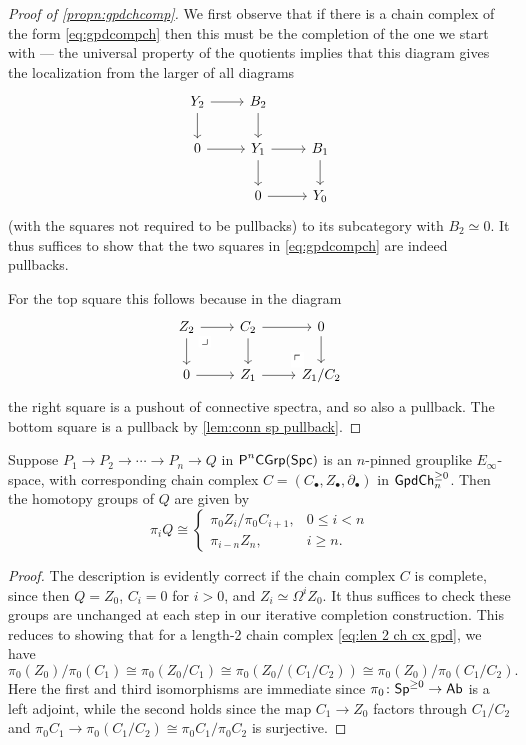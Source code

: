 \documentclass[a4paper,11pt]{article}
\begin{document}
\begin{proof}[Proof of \cref{propn:gpdchcomp}]
  We first observe that if there is a chain complex of the form
  \cref{eq:gpdcompch} then this must be the completion of the one we
  start with --- the universal property of the quotients implies that
  this diagram gives the localization from the larger \icat{} of
  all diagrams
  \[
    \begin{tikzcd}
      Y_{2} \ar[r] \ar[d] & B_{2} \ar[d] \\
      0 \ar[r] & Y_{1} \ar[d] \ar[r]  & B_{1} \ar[d] \\
      &  0 \ar[r] & Y_{0}
    \end{tikzcd}
  \]
  (with the squares not required to be pullbacks) to its subcategory
  with $B_{2} \simeq 0$. It thus suffices to show that the two squares
  in \cref{eq:gpdcompch} are indeed pullbacks.

  For the top square this follows because in the diagram
  \[
    \begin{tikzcd}
      Z_{2} \ar[r] \ar[d] \drpullback & C_{2} \ar[d] \ar[r] \arrow[phantom]{dr}[very near end,description]{\ulcorner} & 0 \ar[d]
      \\
      0 \ar[r]  & Z_{1} \ar[r] & Z_{1}/C_{2}
    \end{tikzcd}
  \]
  the right square is a pushout of connective spectra, and so also a
  pullback. The bottom square is a pullback by \cref{lem:conn sp
    pullback}.
\end{proof}

\begin{cor}\label{cor:complete htpy finite}
  Suppose $P_{1} \to P_{2} \to \cdots \to P_{n} \to Q$ in $\PCGrp[n]$ is an
  $n$-pinned grouplike $E_{\infty}$-space, with corresponding chain complex
  $C=(C_{\bullet}, Z_{\bullet}, \partial_{\bullet})$ in
  $\GpdChp_{n}$. Then the
  homotopy groups of $Q$ are given by
  \[ \pi_{i}Q \cong
    \begin{cases}
      \pi_{0}Z_{i}/\pi_{0}C_{i+1}, & 0 \leq i < n \\
      \pi_{i-n} Z_{n}, & i \geq n.
    \end{cases}
  \]
\end{cor}
\begin{proof}
  The description is evidently correct if the chain complex $C$ is
  complete, since then $Q = Z_{0}$, $C_{i} = 0$ for $i > 0$, and
  $Z_{i} \simeq \Omega^{i}Z_{0}$. It thus suffices to check these
  groups are unchanged at each step in our iterative completion
  construction. This reduces to showing that for a length-2 chain
  complex \cref{eq:len 2 ch cx gpd}, we have
  \[ \pi_{0}(Z_{0})/\pi_{0}(C_{1}) \cong \pi_{0}(Z_{0}/C_{1}) \cong
    \pi_{0}(Z_{0}/(C_{1}/C_{2})) \cong
    \pi_{0}(Z_{0})/\pi_{0}(C_{1}/C_{2}).
  \]
  Here the first and third isomorphisms are immediate since
  $\pi_{0} \colon \Sp^{\geq 0} \to \Ab$ is a left adjoint, while the
  second holds since the map $C_{1} \to Z_{0}$ factors through
  $C_{1}/C_{2}$ and
  $\pi_{0}C_{1} \to \pi_{0}(C_{1}/C_{2}) \cong
  \pi_{0}C_{1}/\pi_{0}C_{2}$ is surjective.
\end{proof}
\end{document}
